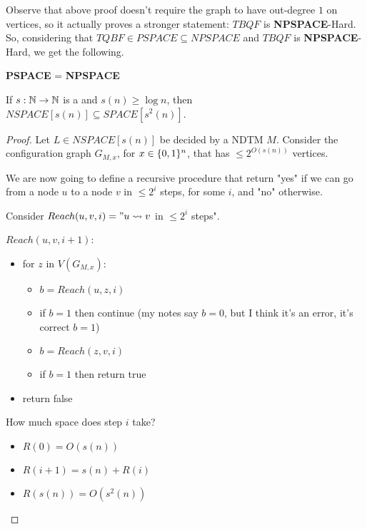     Observe that above proof doesn't require the graph to have out-degree $1$ on vertices, so it actually proves a stronger statement: $TBQF$ is \textbf{NPSPACE}-Hard.
    So, considering that $TQBF \in PSPACE \subseteq NPSPACE$ and $TBQF$ is \textbf{NPSPACE}-Hard, we get the following.

    \begin{corollary}
        \textbf{PSPACE} = \textbf{NPSPACE}
    \end{corollary}

    \begin{theorem}[Savitch]\label{thm:savitch}
        If $s : \mathbb{N} \rightarrow \mathbb{N}$ is a  and $s(n) \geq \log n$, then $NSPACE[s(n)] \subseteq SPACE[s^2(n)]$.
    \end{theorem}

    \begin{proof}
        Let $L \in NSPACE[s(n)]$ be decided by a NDTM $M$.
        Consider the configuration graph $G_{M,x}$, for $x \in \{ 0,1 \}^n$, that has $\leq 2^{O(s(n))}$ vertices.

        We are now going to define a recursive procedure that return "yes" if we can go from a node $u$ to a node $v$ in $\leq 2^i$ steps, for some $i$, and "no" otherwise.

        Consider $Reach(u,v,i) = "u \leadsto v$ in $\leq 2^i$ steps".

        $Reach(u,v,i+1)$:
        \begin{itemize}
            \item for $z$ in $V(G_{M,x})$:
                \begin{itemize}
                    \item $b = Reach(u,z,i)$
                    \item if $b=1$ then continue (my notes say $b=0$, but I think it's an error, it's correct $b=1$)
                    \item $b = Reach(z,v,i)$
                    \item if $b=1$ then return true
                \end{itemize}
            \item return false
        \end{itemize}

        How much space does step $i$ take?
        \begin{itemize}
            \item $R(0) = O(s(n))$
            \item $R(i+1) = s(n) + R(i)$
            \item $R(s(n)) = O(s^2(n))$
        \end{itemize}
    \end{proof}


